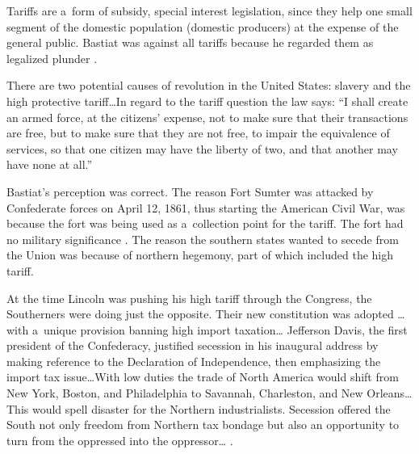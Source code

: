 Tariffs are a~form of subsidy, special interest legislation, since they help one small segment of the domestic population (domestic producers) at the expense of the general public. Bastiat was against all tariffs because he regarded them as legalized plunder 
\parencites[][]{bastiat_essais_1861}[][]{bastiat_libre-echange_1862}[][]{bastiat_correspondance_1862}[][]{bastiat_cobden_1864}[][]{bastiat_ce_1873}[][]{bastiat_sophismes_1873}[][]{bastiat_economic_1964}[][]{bastiat_economic_1964-1}[][]{bastiat_selected_1964}[][]{bastiat_law_1998}[][]{bastiat_bastiat_2007}.%




There are two potential causes of revolution in the United States: slavery and the high protective tariff…In regard to the tariff question the law says: ``I shall create an armed force, at the citizens' expense, not to make sure that their transactions are free, but to make sure that they are not free, to impair the equivalence of services, so that one citizen may have the liberty of two, and that another may have none at all.'' 
\parencite[][p.462]{bastiat_economic_1964-1}%




Bastiat's perception was correct. The reason Fort Sumter was attacked by Confederate forces on April 12, 1861, thus starting the American Civil War, was because the fort was being used as a~collection point for the tariff. The fort had no military significance 
\parencite[][pp.17–33]{adams_when_2000}. %
 The reason the southern states wanted to secede from the Union was because of northern hegemony, part of which included the high tariff.



At the time Lincoln was pushing his high tariff through the Congress, the Southerners were doing just the opposite. Their new constitution was adopted … with a~unique provision banning high import taxation… Jefferson Davis, the first president of the Confederacy, justified secession in his inaugural address by making reference to the Declaration of Independence, then emphasizing the import tax issue…With low duties the trade of North America would shift from New York, Boston, and Philadelphia to Savannah, Charleston, and New Orleans…This would spell disaster for the Northern industrialists. Secession offered the South not only freedom from Northern tax bondage but also an opportunity to turn from the oppressed into the oppressor… 
\parencite[][p.332]{adams_for_1993}.%




